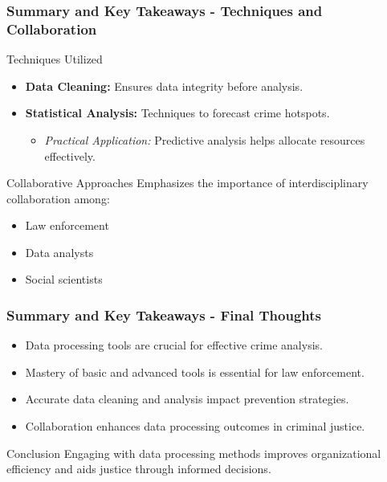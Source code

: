 \documentclass[aspectratio=169]{beamer}
\begin{document}
\begin{frame}[fragile]
  \frametitle{Summary and Key Takeaways - Techniques and Collaboration}
  \begin{block}{Techniques Utilized}
    \begin{itemize}
      \item \textbf{Data Cleaning:} Ensures data integrity before analysis.
      \item \textbf{Statistical Analysis:} Techniques to forecast crime hotspots.
      \begin{itemize}
        \item \textit{Practical Application:} Predictive analysis helps allocate resources effectively.
      \end{itemize}
    \end{itemize}
  \end{block}

  \begin{block}{Collaborative Approaches}
    Emphasizes the importance of interdisciplinary collaboration among:
    \begin{itemize}
      \item Law enforcement
      \item Data analysts
      \item Social scientists
    \end{itemize}
  \end{block}
\end{frame}

\begin{frame}[fragile]
  \frametitle{Summary and Key Takeaways - Final Thoughts}
  \begin{itemize}
    \item Data processing tools are crucial for effective crime analysis.
    \item Mastery of basic and advanced tools is essential for law enforcement.
    \item Accurate data cleaning and analysis impact prevention strategies.
    \item Collaboration enhances data processing outcomes in criminal justice.
  \end{itemize}

  \begin{block}{Conclusion}
    Engaging with data processing methods improves organizational efficiency and aids justice through informed decisions.
  \end{block}
\end{frame}
\end{document}
